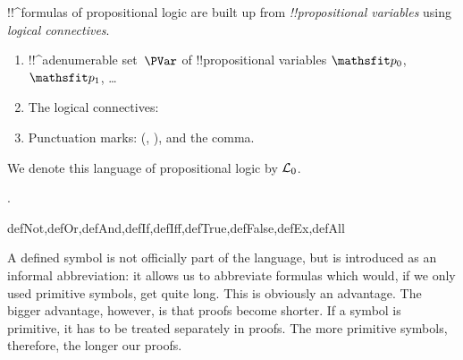 \documentclass[../../../include/open-logic-section]{subfiles}
\begin{document}


!!^{formula}s of propositional logic are built up from
\emph{!!{propositional
    variable}s} using \emph{logical
  connectives}.

\begin{enumerate}
\item !!^a{denumerable} set~$\PVar$ of !!{propositional variable}s $\Obj p_0$,
  $\Obj p_1$, \dots
{}
\item The logical connectives:
  \startycommalist
\item Punctuation marks: (, ), and the comma.
\end{enumerate}

We denote this language of propositional logic by $\Lang L_0$.

.

\begin{tagblock}{defNot,defOr,defAnd,defIf,defIff,defTrue,defFalse,defEx,defAll}
\begin{explain}
A defined symbol is not officially part of the language, but is
introduced as an informal abbreviation: it allows us to abbreviate
formulas which would, if we only used primitive symbols, get quite
long.  This is obviously an advantage.  The bigger advantage, however,
is that proofs become shorter.  If a symbol is primitive, it has to be
treated separately in proofs. The more primitive symbols, therefore,
the longer our proofs.
\end{explain}
\end{tagblock}
\end{document}
